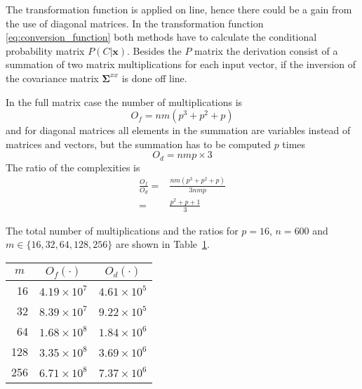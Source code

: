 The transformation function is applied on line, hence there could be a gain from the use of diagonal matrices. In the transformation function \eqref{eq:conversion_function} both methods have to calculate the conditional probability matrix $P(C\vert \mathbf{x})$. Besides the $P$ matrix the derivation consist of a summation of two matrix multiplications for each input vector, if the inversion of the covariance matrix $\mathbf{\Sigma}^{xx}$ is done off line.

In the full matrix case the number of multiplications is
\begin{equation}
	O_f = nm(p^3 + p^2+p)
\end{equation}
and for diagonal matrices all elements in the summation are variables instead of matrices and vectors, but the summation has to be computed $p$ times
\begin{equation}
	O_d = nmp\times3
\end{equation}
The ratio of the complexities is
\begin{equation}
	\begin{split}
		\frac{O_f}{O_d} = & \frac{nm(p^3 + p^2+p)}{3nmp} \\
		= & \frac{p^2 + p+1}{3}
	\end{split}
\end{equation}

The total number of multiplications and the ratios for $p=16$, $n=600$ and $m\in \{16,32,64,128,256\}$ are shown in Table~\ref{tab:derivation_complexity}.
\begin{table}[ht]
	\begin{center}
		\begin{tabular}{rll}
			\toprule
			\multicolumn{1}{c}{$m$} & \multicolumn{1}{c}{$O_f(\cdot)$} & \multicolumn{1}{c}{$O_d(\cdot)$} \\
			\midrule
			16 & $4.19 \times 10^7$ & $4.61 \times 10^5$ \\
			32 & $8.39 \times 10^7$ & $9.22 \times 10^5$ \\
			64 & $1.68 \times 10^8$ & $1.84 \times 10^6$ \\
			128 & $3.35 \times 10^8$ & $3.69 \times 10^6$ \\
			256 & $6.71 \times 10^8$ & $7.37 \times 10^6$ \\
			\bottomrule			
		\end{tabular}		
	\end{center}
\label{tab:derivation_complexity}	
\end{table}

